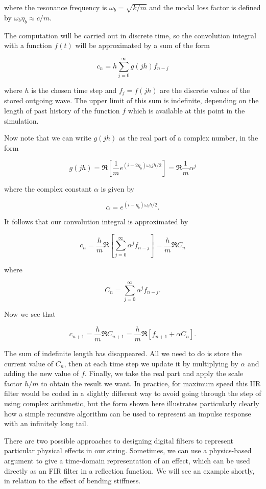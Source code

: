   where the resonance frequency is $\omega_b = \sqrt{k/m}$ and the modal loss 
  factor is defined by $\omega_b \eta_b \approx c/m$. 

  The computation will be carried out in discrete time, so the convolution 
  integral with a function $f(t)$ will be approximated by a sum of the form 

  $$c_n=h\sum_{j=0}^{\infty}{g(jh) f_{n-j}} \tag{2}$$ 

  where $h$ is the chosen time step and $f_j=f(jh)$ are the discrete values of 
  the stored outgoing wave. The upper limit of this sum is indefinite, 
  depending on the length of past history of the function $f$ which is 
  available at this point in the simulation. 

  Now note that we can write $g(jh)$ as the real part of a complex number, in 
  the form 

  $$g(jh) = \Re{\left[ \dfrac{1}{m} e^{(i-2\eta_b)\omega_b jh/2} \right]} = 
  \Re{\dfrac{1}{m} \alpha^j} \tag{3}$$ 

  where the complex constant $\alpha$ is given by 

  $$\alpha=e^{(i- \eta_b)\omega_b h/2} . \tag{4}$$ 

  It follows that our convolution integral is approximated by 

  $$c_n=\dfrac{h}{m}\Re{\left[\sum_{j=0}^{\infty}{\alpha^j f_{n-j}} 
  \right]}=\dfrac{h}{m}\Re{C_n} \tag{5}$$ 

  where 

  $$C_n=\sum_{j=0}^{\infty}{\alpha^j f_{n-j}}. \tag{6}$$ 

  Now we see that 

  $$c_{n+1}=\dfrac{h}{m}\Re{C_{n+1}}=\dfrac{h}{m} \Re{\left[f_{n+1}+\alpha 
  C_{n} \right]} . \tag{7}$$ 

  The sum of indefinite length has disappeared. All we need to do is store the 
  current value of $C_n$, then at each time step we update it by multiplying by 
  $\alpha$ and adding the new value of $f$. Finally, we take the real part and 
  apply the scale factor $h/m$ to obtain the result we want. In practice, for 
  maximum speed this IIR filter would be coded in a slightly different way to 
  avoid going through the step of using complex arithmetic, but the form shown 
  here illustrates particularly clearly how a simple recursive algorithm can be 
  used to represent an impulse response with an infinitely long tail. 

  There are two possible approaches to designing digital filters to represent 
  particular physical effects in our string. Sometimes, we can use a 
  physics-based argument to give a time-domain representation of an effect, 
  which can be used directly as an FIR filter in a reflection function. We will 
  see an example shortly, in relation to the effect of bending stiffness. 

